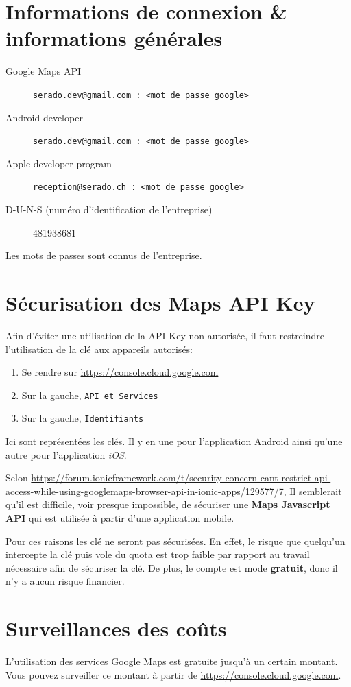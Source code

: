 \documentclass[french]{report}
\begin{document}
\section{Informations de connexion \& informations générales}
\begin{description}
    \item[Google Maps API] \verb|serado.dev@gmail.com : <mot de passe google>|
    \item[Android developer] \verb|serado.dev@gmail.com : <mot de passe google>|
    \item[Apple developer program] \verb|reception@serado.ch : <mot de passe google>| 
    \item[D-U-N-S (numéro d'identification de l'entreprise)] 481938681
\end{description}

Les mots de passes sont connus de l'entreprise.

\section{Sécurisation des Maps API Key}\label{sec:api_key}
Afin d'éviter une utilisation de la API Key non autorisée, il faut restreindre
l'utilisation de la clé aux appareils autorisés:
\begin{enumerate}
    \item Se rendre sur \url{https://console.cloud.google.com}\label{cloud}
    \item Sur la gauche, \verb|API et Services|
    \item Sur la gauche, \verb|Identifiants|
\end{enumerate}
Ici sont représentées les clés. Il y en une pour l'application Android ainsi qu'une
autre pour l'application \textit{iOS}.

Selon \url{https://forum.ionicframework.com/t/security-concern-cant-restrict-api-access-while-using-googlemaps-browser-api-in-ionic-apps/129577/7},
Il semblerait qu'il est difficile, voir presque impossible, de sécuriser une \textbf{Maps
 Javascript API} qui est utilisée à partir d'une application mobile.

Pour ces raisons les clé ne seront pas sécurisées. En effet, le risque que quelqu'un
intercepte la clé puis vole du quota est trop faible par rapport au travail nécessaire
afin de sécuriser la clé. De plus, le compte est mode \textbf{gratuit}, donc il n'y a aucun
risque financier. 

\section{Surveillances des coûts}
L'utilisation des services Google Maps est gratuite jusqu'à un certain montant.
Vous pouvez surveiller ce montant à partir de \url{https://console.cloud.google.com}.
\end{document}
